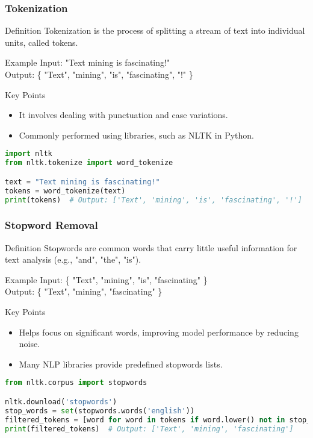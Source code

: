 \documentclass[aspectratio=169]{beamer}
\begin{document}
\begin{frame}[fragile]
    \frametitle{Tokenization}
    \begin{block}{Definition}
        Tokenization is the process of splitting a stream of text into individual units, called tokens. 
    \end{block}
    \begin{block}{Example}
        Input: "Text mining is fascinating!" \\
        Output: \{ "Text", "mining", "is", "fascinating", "!" \}
    \end{block}
    \begin{block}{Key Points}
        \begin{itemize}
            \item It involves dealing with punctuation and case variations.
            \item Commonly performed using libraries, such as NLTK in Python.
        \end{itemize}
    \end{block}
    \begin{lstlisting}[language=Python]
import nltk
from nltk.tokenize import word_tokenize

text = "Text mining is fascinating!"
tokens = word_tokenize(text)
print(tokens)  # Output: ['Text', 'mining', 'is', 'fascinating', '!']
    \end{lstlisting}
\end{frame}

\begin{frame}[fragile]
    \frametitle{Stopword Removal}
    \begin{block}{Definition}
        Stopwords are common words that carry little useful information for text analysis (e.g., "and", "the", "is").
    \end{block}
    \begin{block}{Example}
        Input: \{ "Text", "mining", "is", "fascinating" \} \\
        Output: \{ "Text", "mining", "fascinating" \}
    \end{block}
    \begin{block}{Key Points}
        \begin{itemize}
            \item Helps focus on significant words, improving model performance by reducing noise.
            \item Many NLP libraries provide predefined stopwords lists.
        \end{itemize}
    \end{block}
    \begin{lstlisting}[language=Python]
from nltk.corpus import stopwords

nltk.download('stopwords')
stop_words = set(stopwords.words('english'))
filtered_tokens = [word for word in tokens if word.lower() not in stop_words]
print(filtered_tokens)  # Output: ['Text', 'mining', 'fascinating']
    \end{lstlisting}
\end{frame}
\end{document}
